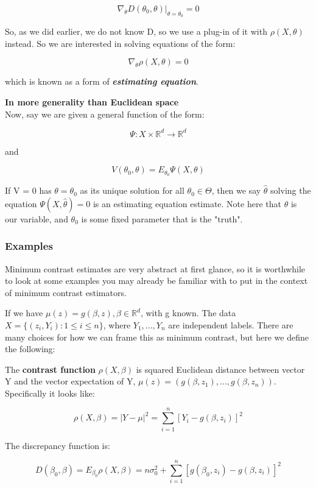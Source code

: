 			$$\nabla_\theta D(\theta_0, \theta) |_{\theta=\theta_0} = 0$$

		So, as we did earlier, we do not know D, so we use a plug-in of it with $\rho(X, \theta)$ instead. So we are interested in solving equations of the form:

			$$\nabla_\theta \rho(X, \theta) = 0$$

		which is known as a form of \textit{\textbf{estimating equation}}.

		\textbf{In more generality than Euclidean space}\\	
		Now, say we are given a general function of the form:

		$$\Psi : X \times \mathbb{R}^d \rightarrow \mathbb{R}^d$$

		and 

		$$V(\theta_0, \theta) = E_{\theta_0} \Psi(X, \theta)$$

		If V = 0 has $\theta=\theta_0$ as its unique solution for all $\theta_0 \in \Theta$, then we say $\hat{\theta}$ solving the equation $\Psi(X, \hat{\theta}) = 0$ is an estimating equation estimate. Note here that $\theta$ is our variable, and $\theta_0$ is some fixed parameter that is the "truth".

		\subsubsection{Examples}
			Minimum contrast estimates are very abstract at first glance, so it is worthwhile to look at some examples you may already be familiar with to put in the context of minimum contrast estimators.


				If we have $\mu(z) = g(\beta, z), \beta \in \mathbb{R}^d$, with g known. The data $X = \{(z_i, Y_i) : 1 \le i \le n\}$, where $Y_1, ..., Y_n$ are independent labels. There are many choices for how we can frame this as minimum contrast, but here we define the following:

				The \textbf{contrast function} $\rho(X, \beta)$ is squared Euclidean distance between vector Y and the vector expectation of Y, $\mu(z) = (g(\beta, z_1), ..., g(\beta, z_n))$. Specifically it looks like:

					$$\rho(X, \beta) = |Y - \mu|^2 = \sum_{i=1}^n [ Y_i - g(\beta, z_i)]^2$$

				The discrepancy function is:

					$$D(\beta_0, \beta) = E_{\beta_0} \rho(X, \beta) = n \sigma_0^2 + \sum_{i=1}^n [ g(\beta_0, z_i) - g(\beta, z_i)]^2$$

